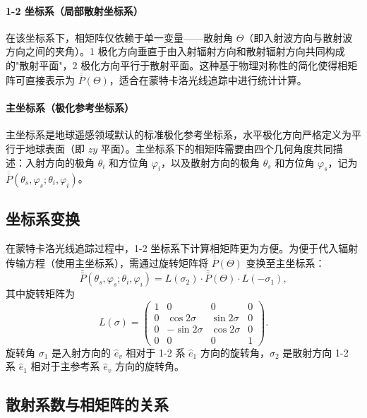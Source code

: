 \documentclass[UTF8,a4paper,12pt]{ctexart}
\begin{document}
\paragraph{1-2 坐标系（局部散射坐标系）}
在该坐标系下，相矩阵仅依赖于单一变量——散射角 $\Theta$（即入射波方向与散射波方向之间的夹角）。1 极化方向垂直于由入射辐射方向和散射辐射方向共同构成的"散射平面"，2 极化方向平行于散射平面。这种基于物理对称性的简化使得相矩阵可直接表示为 $\overline{\overline{P}}(\Theta)$，适合在蒙特卡洛光线追踪中进行统计计算。

\paragraph{主坐标系（极化参考坐标系）}
主坐标系是地球遥感领域默认的标准极化参考坐标系，水平极化方向严格定义为平行于地球表面（即 $zy$ 平面）。主坐标系下的相矩阵需要由四个几何角度共同描述：入射方向的极角 $\theta_i$ 和方位角 $\varphi_i$，以及散射方向的极角 $\theta_s$ 和方位角 $\varphi_s$，记为 $\overline{\overline{P}}(\theta_s, \varphi_s; \theta_i, \varphi_i)$。

\subsection{坐标系变换}

在蒙特卡洛光线追踪过程中，1-2 坐标系下计算相矩阵更为方便。为便于代入辐射传输方程（使用主坐标系），需通过旋转矩阵将 $\overline{\overline{P}}(\Theta)$ 变换至主坐标系：
\begin{equation}
  \bar{\bar{P}}(\theta_s,\varphi_s;\theta_i,\varphi_i)
  = L(\sigma_2) \cdot \bar{\bar{P}}(\Theta) \cdot L(-\sigma_1),
  \label{eq:pm-transform}
\end{equation}
其中旋转矩阵为
\begin{equation}
  L(\sigma) =
  \begin{pmatrix}
    1 & 0 & 0 & 0 \\
    0 & \cos 2\sigma & \sin 2\sigma & 0 \\
    0 & -\sin 2\sigma & \cos 2\sigma & 0 \\
    0 & 0 & 0 & 1
  \end{pmatrix}.
  \label{eq:rotation-matrix}
\end{equation}
旋转角 $\sigma_1$ 是入射方向的 $\hat{e}_v$ 相对于 1-2 系 $\hat{e}_1$ 方向的旋转角，$\sigma_2$ 是散射方向 1-2 系 $\hat{e}_1$ 相对于主参考系 $\hat{e}_v$ 方向的旋转角。

\subsection{散射系数与相矩阵的关系}
\end{document}
